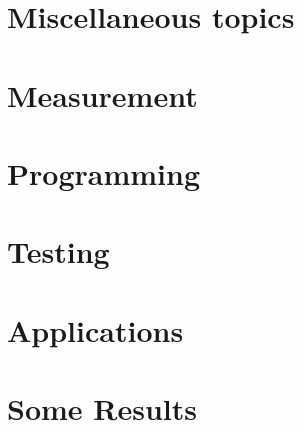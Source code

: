 \documentclass[3pt]{ctexart}
\begin{document}





\clearpage

\section{\label{sec:Miscellaneous}Miscellaneous topics}





\clearpage

\section{\label{sec:GaugeFixing}Measurement}













\clearpage

\section{\label{sec:Programming}Programming}



\clearpage

\section{\label{sec:Testing}Testing}



\clearpage

\section{\label{sec:Applications}Applications}









\clearpage

\section{\label{sec:SomeResults}Some Results}





\clearpage

\printindex



\end{document}
